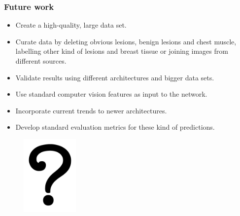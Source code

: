 \documentclass{beamer}
\begin{document}
	\begin{frame}
		\frametitle{Future work}
		\begin{itemize}
		    \item Create a high-quality, large data set.
		    \item Curate data by deleting obvious lesions, benign lesions and chest muscle, labelling other kind of lesions and breast tissue or joining images from different sources.
		    \item Validate results using different architectures and bigger data sets.
		    \item Use standard computer vision features as input to the network.
		    \item Incorporate current trends to newer architectures.
		    \item Develop standard evaluation metrics for these kind of predictions.
		\end{itemize}
	\end{frame}

	\begin{frame}[c]
		\begin{center}
			\begin{figure}
				\includegraphics[width=0.25\textwidth]{plots/questions.png}
			\end{figure}
		\end{center}
	\end{frame}
\end{document}
